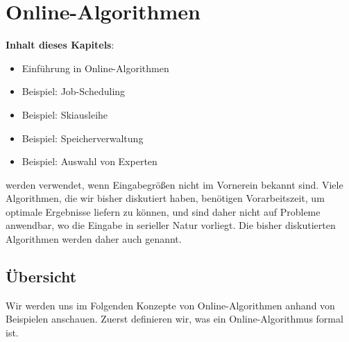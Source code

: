 \chapter{Online-Algorithmen}

\begin{tcolorbox}[colframe=black!3!white]
  \textbf{Inhalt dieses Kapitels}:
  \tcblower{} 
  \begin{itemize}
    \item Einführung in Online-Algorithmen
    \item Beispiel: Job-Scheduling
    \item Beispiel: Skiausleihe
    \item Beispiel: Speicherverwaltung
    \item Beispiel: Auswahl von Experten
  \end{itemize}
\end{tcolorbox}

 werden verwendet, wenn Eingabegrößen nicht im Vornerein bekannt sind. Viele Algorithmen, die wir bisher diskutiert haben, benötigen Vorarbeitszeit, um optimale Ergebnisse liefern zu können, und sind daher nicht auf Probleme anwendbar, wo die Eingabe in serieller Natur vorliegt. Die bisher diskutierten Algorithmen werden daher auch  genannt.

\section{Übersicht}

Wir werden uns im Folgenden Konzepte von Online-Algorithmen anhand von Beispielen anschauen. Zuerst definieren wir, was ein Online-Algorithmus formal ist.

